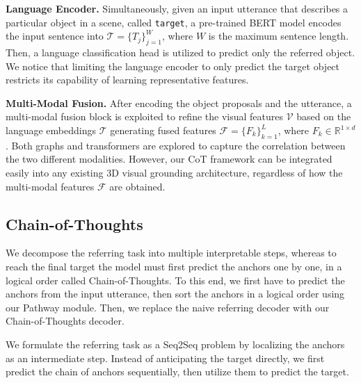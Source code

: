 \noindent \textbf{Language Encoder.}
Simultaneously, given an input utterance that describes a particular object in a scene, called \texttt{target}, a pre-trained BERT model \citep{devlin2018bert} encodes the input sentence into $\mathcal{T}=\{T_j\}_{j=1}^{W}$, where $W$ is the maximum sentence length.
Then, a language classification head is utilized to predict only the referred object.
We notice that limiting the language encoder to only predict the target object restricts its capability of learning representative features.

\noindent \textbf{Multi-Modal Fusion.}
After encoding the object proposals and the utterance, a multi-modal fusion block is exploited to refine the visual features $\mathcal{V}$ based on the language embeddings $\mathcal{T}$ generating fused features $\mathcal{F}=\{F_k\}_{k=1}^{L}$, where $F_k \in \mathbb{R}^{1\times d}$. 
Both graphs \citep{achlioptas2020referit3d} and transformers \citep{huang2022multi, bakr2022look, yang2021sat} are explored to capture the correlation between the two different modalities. 
However, our CoT framework can be integrated easily into any existing 3D visual grounding architecture, regardless of how the multi-modal features $\mathcal{F}$ are obtained.

\subsection{Chain-of-Thoughts}
\label{sec_CoT}

We decompose the referring task into multiple interpretable steps, whereas to reach the final target the model must first predict the anchors one by one, in a logical order called Chain-of-Thoughts.
To this end, we first have to predict the anchors from the input utterance, then sort the anchors in a logical order using our Pathway module.
Then, we replace the naive referring decoder with our Chain-of-Thoughts decoder.

We formulate the referring task as a Seq2Seq problem by localizing the anchors as an intermediate step. Instead of anticipating the target directly, we first predict the chain of anchors sequentially, then utilize them to predict the target.

